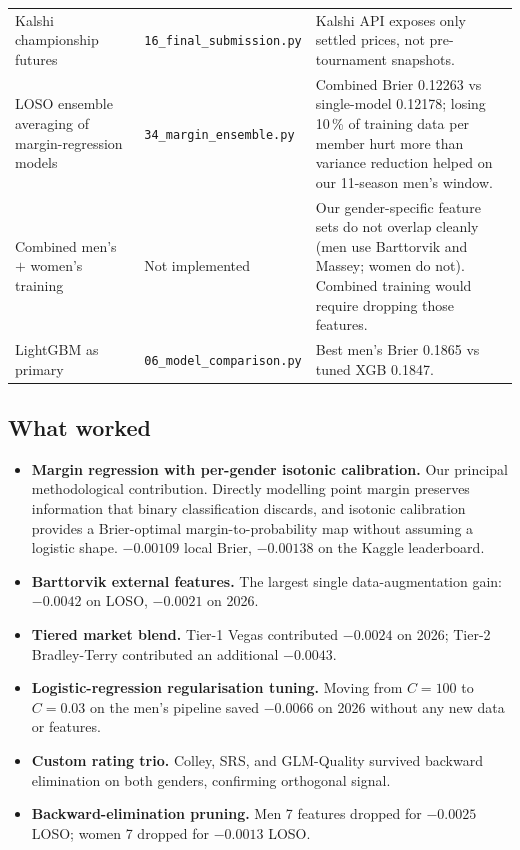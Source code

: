 \documentclass[11pt, a4paper]{article}
\begin{document}
{\begin{longtable}{@{}>{\raggedright\arraybackslash}p{4.5cm} >{\raggedright\arraybackslash}p{4.2cm} >{\raggedright\arraybackslash}p{5.8cm}@{}}
Kalshi championship futures & \texttt{16\_final\_submission.py} & Kalshi API exposes only settled prices, not pre-tournament snapshots. \\
LOSO ensemble averaging of margin-regression models & \texttt{34\_margin\_ensemble.py} & Combined Brier 0.12263 vs single-model 0.12178; losing 10\,\% of training data per member hurt more than variance reduction helped on our 11-season men's window. \\
Combined men's $+$ women's training & Not implemented & Our gender-specific feature sets do not overlap cleanly (men use Barttorvik and Massey; women do not). Combined training would require dropping those features. \\
LightGBM as primary & \texttt{06\_model\_comparison.py} & Best men's Brier 0.1865 vs tuned XGB 0.1847. \\
\bottomrule
\end{longtable}
}

\subsection{What worked}
\begin{itemize}[leftmargin=*]
    \item \textbf{Margin regression with per-gender isotonic calibration.} Our principal methodological contribution. Directly modelling point margin preserves information that binary classification discards, and isotonic calibration provides a Brier-optimal margin-to-probability map without assuming a logistic shape. $-0.00109$ local Brier, $-0.00138$ on the Kaggle leaderboard.
    \item \textbf{Barttorvik external features.} The largest single data-augmentation gain: $-0.0042$ on LOSO, $-0.0021$ on 2026.
    \item \textbf{Tiered market blend.} Tier-1 Vegas contributed $-0.0024$ on 2026; Tier-2 Bradley-Terry contributed an additional $-0.0043$.
    \item \textbf{Logistic-regression regularisation tuning.} Moving from $C = 100$ to $C = 0.03$ on the men's pipeline saved $-0.0066$ on 2026 without any new data or features.
    \item \textbf{Custom rating trio.} Colley, SRS, and GLM-Quality survived backward elimination on both genders, confirming orthogonal signal.
    \item \textbf{Backward-elimination pruning.} Men 7 features dropped for $-0.0025$ LOSO; women 7 dropped for $-0.0013$ LOSO.
\end{itemize}
\end{document}
